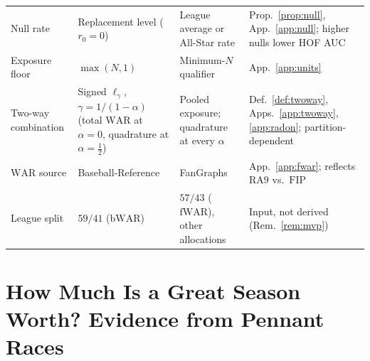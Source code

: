 \documentclass[11pt,letterpaper]{article}
\theoremstyle{plain}
\theoremstyle{definition}
\theoremstyle{remark}
\newcommand{\WAR}{\mathrm{WAR}}
\begin{document}
\begin{table}[htbp]
\begin{tabular}{@{}>{\raggedright\arraybackslash}p{3.1cm}>{\raggedright\arraybackslash}p{3.6cm}>{\raggedright\arraybackslash}p{4.0cm}>{\raggedright\arraybackslash}p{3.6cm}@{}}
Null rate & Replacement level ($r_0 = 0$) & League average or All-Star rate & Prop.~\ref{prop:null}, App.~\ref{app:null}; higher nulls lower HOF AUC \\
Exposure floor & $\max(N,1)$ & Minimum-$N$ qualifier & App.~\ref{app:units} \\
Two-way combination & Signed $\ell_\gamma$, $\gamma = 1/(1-\alpha)$ (total $\WAR$ at $\alpha = 0$, quadrature at $\alpha = \tfrac12$) & Pooled exposure; quadrature at every $\alpha$ & Def.~\ref{def:twoway}, Apps.~\ref{app:twoway}, \ref{app:radon}; partition-dependent \\
$\WAR$ source & Baseball-Reference & FanGraphs & App.~\ref{app:fwar}; reflects $\mathrm{RA9}$ vs.\ $\mathrm{FIP}$ \\
League split & $59/41$ ($\mathrm{bWAR}$) & $57/43$ ($\mathrm{fWAR}$), other allocations & Input, not derived (Rem.~\ref{rem:mvp}) \\
\bottomrule
\end{tabular}
\end{table}

\section{How Much Is a Great Season Worth? Evidence from Pennant Races}
\label{sec:gamma}
\end{document}
